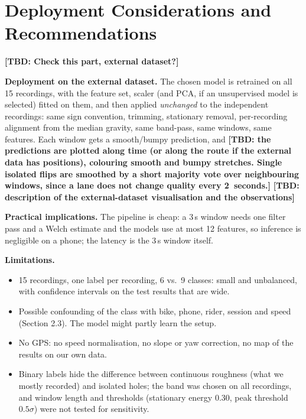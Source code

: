 \documentclass[10pt,a4paper]{article}
\newcommand{\tbd}[1]{\textbf{\textcolor{red!70!black}{[TBD: #1]}}}
\begin{document}
\section{Deployment Considerations and Recommendations}
\label{sec:deploy}
\tbd{Check this part, external dataset?}

\textbf{Deployment on the external dataset.} The chosen model is retrained on all 15 recordings, with the feature set, scaler (and PCA, if an unsupervised model is selected) fitted on them, and then applied \emph{unchanged} to the independent recordings: same sign convention, trimming, stationary removal, per-recording alignment from the median gravity, same band-pass, same windows, same features. Each window gets a smooth/bumpy prediction, and \tbd{the predictions are plotted along time (or along the route if the external data has positions), colouring smooth and bumpy stretches. Single isolated flips are smoothed by a short majority vote over neighbouring windows, since a lane does not change quality every 2~seconds.} \tbd{description of the external-dataset visualisation and the observations}

\textbf{Practical implications.} The pipeline is cheap: a 3\,s window needs one filter pass and a Welch estimate and the models use at most 12 features, so inference is negligible on a phone; the latency is the 3\,s window itself.

\textbf{Limitations.}
\begin{itemize}
  \item 15 recordings, one label per recording, 6 vs.\ 9 classes: small and unbalanced, with confidence intervals on the test results that are wide.
  \item Possible confounding of the class with bike, phone, rider, session and speed (Section 2.3). The model might partly learn the setup.
  \item No GPS: no speed normalisation, no slope or yaw correction, no map of the results on our own data.
  \item Binary labels hide the difference between continuous roughness (what we mostly recorded) and isolated holes; the band was chosen on all recordings, and window length and thresholds (stationary energy 0.30, peak threshold $0.5\sigma$) were not tested for sensitivity.
\end{itemize}
\end{document}
